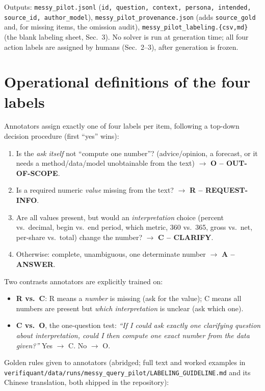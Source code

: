 \documentclass[11pt]{article}
\begin{document}
Outputs: \texttt{messy\_pilot.jsonl} (\texttt{id, question, context, persona, intended,
source\_id, author\_model}), \texttt{messy\_pilot\_provenance.json} (adds
\texttt{source\_gold} and, for missing items, the omission audit),
\texttt{messy\_pilot\_labeling.\{csv,md\}} (the blank labeling sheet, Sec.~3).
No solver is run at generation time; all four action labels are assigned by humans (Sec.~2--3),
after generation is frozen.

\section{Operational definitions of the four labels}
Annotators assign exactly one of four labels per item, following a top-down decision procedure
(first ``yes'' wins):
\begin{enumerate}[leftmargin=*]
\item Is the \emph{ask itself} not ``compute one number''? (advice/opinion, a forecast, or it
needs a method/data/model unobtainable from the text) $\to$ \textbf{O -- OUT-OF-SCOPE}.
\item Is a required numeric \emph{value} missing from the text? $\to$ \textbf{R --
REQUEST-INFO}.
\item Are all values present, but would an \emph{interpretation} choice (percent vs.\ decimal,
begin vs.\ end period, which metric, 360 vs.\ 365, gross vs.\ net, per-share vs.\ total) change
the number? $\to$ \textbf{C -- CLARIFY}.
\item Otherwise: complete, unambiguous, one determinate number $\to$ \textbf{A -- ANSWER}.
\end{enumerate}
Two contrasts annotators are explicitly trained on:
\begin{itemize}[leftmargin=*]
\item \textbf{R vs.\ C}: R means a \emph{number} is missing (ask for the value); C means all
numbers are present but \emph{which interpretation} is unclear (ask which one).
\item \textbf{C vs.\ O}, the one-question test: \emph{``If I could ask exactly one clarifying
question about interpretation, could I then compute one exact number from the data given?''}
Yes $\to$ C. No $\to$ O.
\end{itemize}
Golden rules given to annotators (abridged; full text and worked examples in
\texttt{verifiquant/data/runs/messy\_query\_pilot/LABELING\_GUIDELINE.md} and its Chinese
translation, both shipped in the repository):
\end{document}
